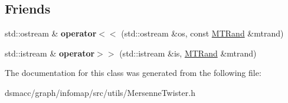 \subsection*{Friends}
\begin{DoxyCompactItemize}
\item 
\mbox{\label{classMTRand_a059061d50a1e54ee3067d4e1dbdd7c64}} 
std\+::ostream \& {\bfseries operator$<$$<$} (std\+::ostream \&os, const \mbox{\hyperlink{classMTRand}{M\+T\+Rand}} \&mtrand)
\item 
\mbox{\label{classMTRand_a45b02a702835a3be42171c5c2dc79b2d}} 
std\+::istream \& {\bfseries operator$>$$>$} (std\+::istream \&is, \mbox{\hyperlink{classMTRand}{M\+T\+Rand}} \&mtrand)
\end{DoxyCompactItemize}


The documentation for this class was generated from the following file\+:\begin{DoxyCompactItemize}
\item 
dsmacc/graph/infomap/src/utils/Mersenne\+Twister.\+h\end{DoxyCompactItemize}
